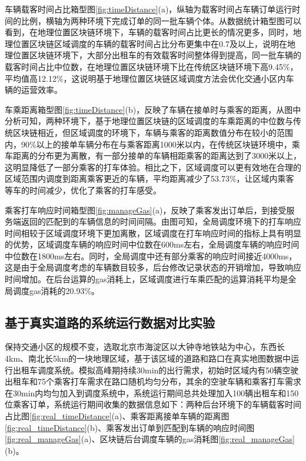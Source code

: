 车辆载客时间占比箱型图\ref{fig:timeDistance}(a)，纵轴为载客时间占车辆订单运行时间的比例，横轴为两种环境下完成订单的同一批车辆个体。从数据统计箱型图可以看到，在地理位置区块链环境下，车辆的载客时间占比更长的情况更多，同时，地理位置区块链区域调度的车辆的载客时间占比分布更集中在0.7及以上，说明在地理位置区块链环境下，大部分出租车的有效载客时间整体得到提高，同一批车辆的载客时间占比中位数，在地理位置区块链环境下比在传统区块链环境下高9.45$\%$，平均值高12.12$\%$，这说明基于地理位置区块链区域调度方法会优化交通小区内车辆的运营效率。

车乘距离箱型图\ref{fig:timeDistance}(b)，反映了车辆在接单时与乘客的距离，从图中分析可知，两种环境下，基于地理位置区块链的区域调度的车乘距离的中位数与传统区块链相近，但区域调度的环境下，车辆与乘客的距离数值分布在较小的范围内，90$\%$以上的接单车辆分布在与乘客距离1000米以内，在传统区块链环境中，乘车距离的分布更为离散，有一部分接单的车辆相距乘客的距离达到了3000米以上，这明显降低了一部分乘客的打车体验。相比之下，区域调度可以更有效地在合理的区域范围内调度到距离乘客更近的车辆，平均距离减少了53.73$\%$，让区域内乘客等车的时间减少，优化了乘客的打车感受。

乘客打车响应时间箱型图\ref{fig:manageGas}(a)，反映了乘客发出订单后，到接受服务端返回的匹配到的车辆信息的时间间隔。由图可知，全局调度环境下的打车响应时间相较于区域调度环境下更加离散，区域调度在打车响应时间的指标上具有明显的优势，区域调度车辆的响应时间中位数在600ms左右，全局调度车辆的响应时间中位数在1800ms左右。同时，全局调度中还有部分乘客的响应时间接近4000ms，这是由于全局调度考虑的车辆数目较多，后台修改记录状态的开销增加，导致响应时间增加。在后台运算的gas消耗上，区域调度进行车乘匹配的运算消耗平均是全局调度gas消耗的20.93$\%$。

\subsection{基于真实道路的系统运行数据对比实验}
保持交通小区的规模不变，选取北京市海淀区以大钟寺地铁站为中心，东西长4km、南北长5km的一块地理区域，基于该区域的道路和路口在真实地图数据中运行出租车调度系统。模拟高峰期持续30min的出行需求，初始时区域内有50辆空驶出租车和75个乘客打车需求在路口随机均匀分布，其余的空驶车辆和乘客打车需求在30min内均匀加入到调度系统中，系统运行期间总共处理加入100辆出租车和150位乘客订单，系统运行期间收集的数据信息如下：两种后台环境下的车辆载客时间占比图\ref{fig:real_timeDistance}(a)、乘客距离接单车辆的距离图\ref{fig:real_timeDistance}(b)、乘客发出订单到匹配到车辆的响应时间图\ref{fig:real_manageGas}(a)、区块链后台调度车辆的gas消耗图\ref{fig:real_manageGas}(b)。

